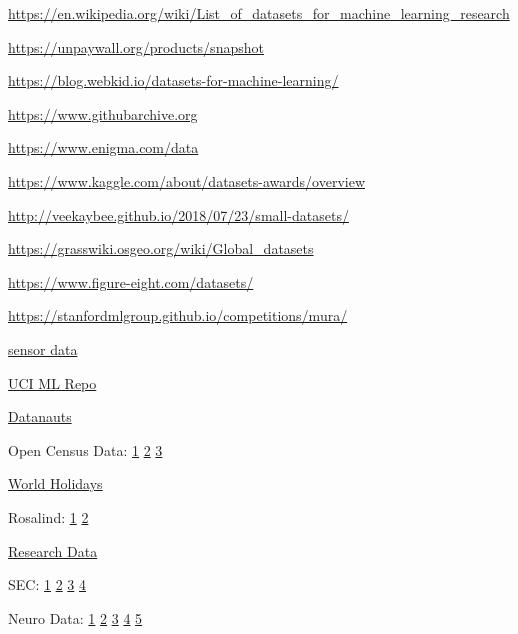 \documentclass[]{book}
\begin{document}
\url{https://en.wikipedia.org/wiki/List_of_datasets_for_machine_learning_research}

\url{https://unpaywall.org/products/snapshot}

\url{https://blog.webkid.io/datasets-for-machine-learning/}

\url{https://www.githubarchive.org}

\url{https://www.enigma.com/data}

\url{https://www.kaggle.com/about/datasets-awards/overview}

\url{http://veekaybee.github.io/2018/07/23/small-datasets/}

\url{https://grasswiki.osgeo.org/wiki/Global_datasets}

\url{https://www.figure-eight.com/datasets/}

\url{https://stanfordmlgroup.github.io/competitions/mura/}

\href{https://data.melbourne.vic.gov.au/Transport-Movement/Pedestrian-volume-updated-monthly-/b2ak-trbp}{sensor
data}

\href{http://archive.ics.uci.edu/ml/}{UCI ML Repo}

\href{https://open.nasa.gov/explore/datanauts/}{Datanauts}

Open Census Data:
\href{https://www.producthunt.com/posts/open-census-data}{1} \textbar{}
\href{https://www.safegraph.com/open-census-data?ref=producthunt}{2}
\textbar{} \href{https://docs.safegraph.com/docs/open-census-data}{3}

\href{https://date.nager.at/}{World Holidays}

Rosalind: \href{http://rosalind.info/problems/locations/}{1} \textbar{}
\href{https://github.com/mtarbit/Rosalind-Problems}{2}

\href{http://academictorrents.com/}{Research Data}

SEC: \href{https://www.sec.gov/structureddata}{1} \textbar{}
\href{https://www.sec.gov/dera/data/financial-statement-and-notes-data-set.html}{2}
\textbar{}
\href{https://www.sec.gov/dera/data/financial-statement-data-sets.html}{3}
\textbar{}
\href{https://www.sec.gov/dera/data/financial-statement-data-sets.html}{4}

Neuro Data: \href{http://preprocessed-connectomes-project.org}{1}
\textbar{} \href{http://www.humanconnectomeproject.org}{2} \textbar{}
\href{http://fcon_1000.projects.nitrc.org/indi/abide/}{3} \textbar{}
\href{https://www.ncbi.nlm.nih.gov/pubmed/25840117}{4} \textbar{}
\href{https://coins.mrn.org}{5}
\end{document}
